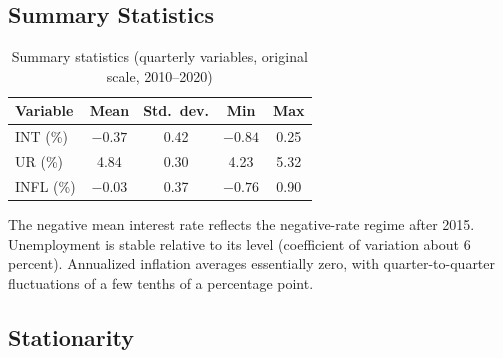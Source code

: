 \documentclass[11pt]{article}
\begin{document}
\subsection{Summary Statistics}

\begin{table}[H]
  \centering
  \caption{Summary statistics (quarterly variables, original scale, 2010--2020)}
  \label{tab:summary}
  \begin{tabular}{lcccc}
    \toprule
    Variable & Mean & Std.\ dev. & Min & Max \\
    \midrule
    INT (\%)  & $-0.37$ & 0.42 & $-0.84$ & 0.25 \\
    UR (\%)   & 4.84    & 0.30 & 4.23    & 5.32 \\
    INFL (\%) & $-0.03$ & 0.37 & $-0.76$ & 0.90 \\
    \bottomrule
  \end{tabular}
\end{table}

The negative mean interest rate reflects the negative-rate regime after 2015. Unemployment is stable relative to its level (coefficient of variation about 6 percent). Annualized inflation averages essentially zero, with quarter-to-quarter fluctuations of a few tenths of a percentage point.

\subsection{Stationarity}
\end{document}
